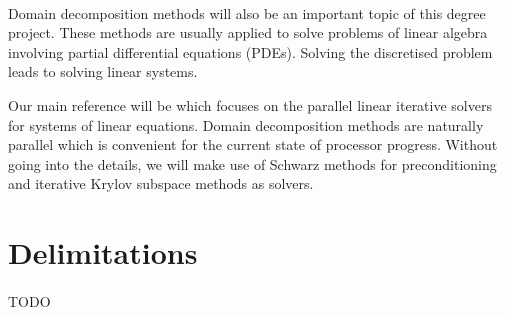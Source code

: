 \paragraph{}
Domain decomposition methods will also be an important topic of this degree project.
These methods are usually applied to solve problems of linear algebra involving partial differential equations (PDEs).
Solving the discretised problem leads to solving linear systems.

Our main reference will be \cite{dolean_domain_2015} which focuses on the parallel linear iterative solvers for systems of linear equations.
Domain decomposition methods are naturally parallel which is convenient for the current state of processor progress.
Without going into the details, we will make use of Schwarz methods for preconditioning and iterative Krylov subspace methods as solvers.

\section{Delimitations}

\paragraph{}
TODO
